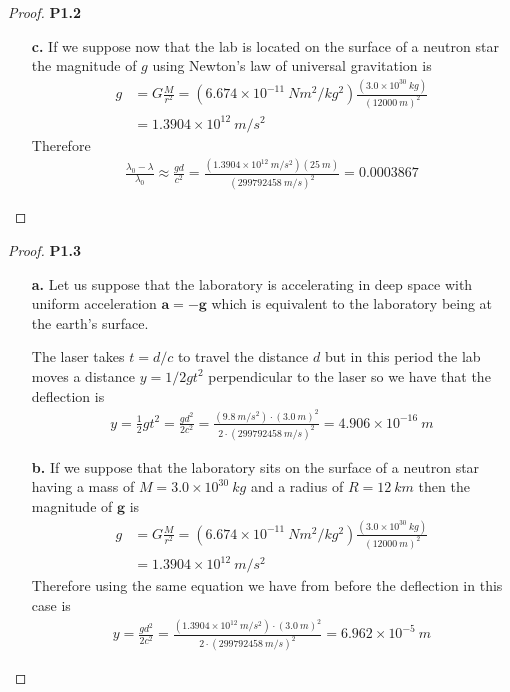 \documentclass[11pt]{article}
\theoremstyle{definition}
\begin{document}
\begin{proof}{\textbf{P1.2}}
\begin{itemize}
    \item [\textbf{c.}] If we suppose now that the lab is located on
    the surface of a neutron star the magnitude of $g$ using Newton's law
    of universal gravitation is
    \begin{align*}
        g &= G\frac{M}{r^2}
        = (6.674\times 10^{-11}~Nm^2/kg^2)
        \frac{(3.0 \times 10^{30}~kg)}{(12000~m)^2}\\
        &= 1.3904 \times 10^{12}~m/s^2
    \end{align*}
    Therefore
    \begin{align*}
        \frac{\lambda_0 - \lambda}{\lambda_0}
        \approx \frac{gd}{c^2}
        = \frac{(1.3904 \times 10^{12}~m/s^2)(25~m)}{(299792458~m/s)^2}
        = 0.0003867
    \end{align*}

\end{itemize}
\end{proof}
\begin{proof}{\textbf{P1.3}}
\begin{itemize}
    \item [\textbf{a.}] Let us suppose that the laboratory is accelerating in
    deep space with uniform acceleration $\bm{a} = -\bm{g}$ which is equivalent
    to the laboratory being at the earth's surface.

    The laser takes $t = d/c$ to travel the distance $d$
    but in this period the lab moves a distance $y = 1/2gt^2$ perpendicular
    to the laser so we have that the deflection is
    \begin{align*}
        y = \frac{1}{2}gt^2 = \frac{gd^2}{2c^2}
        = \frac{(9.8~m/s^2)\cdot(3.0~m)^2}{2\cdot(299792458~m/s)^2}
        = 4.906 \times 10^{-16}~m
    \end{align*}

    \item [\textbf{b.}] If we suppose that the laboratory sits on the surface
    of a neutron star having a mass of $M = 3.0 \times 10^{30}~kg$ and a radius
    of $R = 12~km$ then the magnitude of $\bm{g}$ is
    \begin{align*}
        g &= G\frac{M}{r^2}
        = (6.674\times 10^{-11}~Nm^2/kg^2)
        \frac{(3.0 \times 10^{30}~kg)}{(12000~m)^2}\\
        &= 1.3904 \times 10^{12}~m/s^2
    \end{align*}
    Therefore using the same equation we have from before the deflection in
    this case is
    \begin{align*}
        y = \frac{gd^2}{2c^2}
        = \frac{(1.3904 \times 10^{12}~m/s^2)\cdot(3.0~m)^2}{2\cdot(299792458~m/s)^2}
        = 6.962 \times 10^{-5}~m
    \end{align*}

\end{itemize}
\end{proof}
\end{document}
